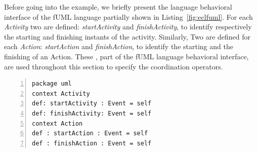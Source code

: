

Before going into the example, we briefly present the language behavioral interface of the fUML language partially shown in  Listing~\ref{fig:eclfuml}. For each \emph{Activity} two \dse are defined: \emph{startActivity} and \emph{finishActivity}, to identify respectively the starting and finishing instants of the activity. Similarly, Two \dse are defined for each \emph{Action}: \emph{startAction} and \emph{finishAction}, to identify the starting and the finishing of an Action. These \dse, part of the fUML language behavioral interface, are used throughout this section to specify the coordination operators.

\begin{lstlisting}[language=ecl,
caption={Partial \ecl specification of Activity Diagram},
label={fig:eclfuml}, 
basicstyle=\scriptsize\ttfamily, backgroundcolor=\color{LGrey}, numbers=left, xleftmargin=3pt, belowskip=-0.4em]
package uml
context Activity
def: startActivity : Event = self
def: finishActivity: Event = self
context Action
def : startAction : Event = self
def : finishAction : Event = self
\end{lstlisting}
